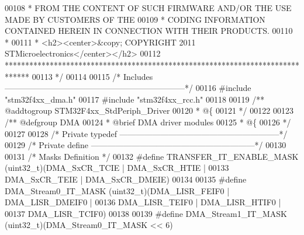 \begin{DoxyCode}
00108 \textcolor{comment}{  * FROM THE CONTENT OF SUCH FIRMWARE AND/OR THE USE MADE BY CUSTOMERS OF THE}
00109 \textcolor{comment}{  * CODING INFORMATION CONTAINED HEREIN IN CONNECTION WITH THEIR PRODUCTS.}
00110 \textcolor{comment}{  *}
00111 \textcolor{comment}{  * <h2><center>&copy; COPYRIGHT 2011 STMicroelectronics</center></h2>}
00112 \textcolor{comment}{  ******************************************************************************  }
00113 \textcolor{comment}{  */}
00114 
00115 \textcolor{comment}{/* Includes ------------------------------------------------------------------*/}
00116 \textcolor{preprocessor}{#}\textcolor{preprocessor}{include} "stm32f4xx_dma.h"
00117 \textcolor{preprocessor}{#}\textcolor{preprocessor}{include} "stm32f4xx_rcc.h"
00118 
00119 \textcolor{comment}{/** @addtogroup STM32F4xx\_StdPeriph\_Driver}
00120 \textcolor{comment}{  * @\{}
00121 \textcolor{comment}{  */}
00122 
00123 \textcolor{comment}{/** @defgroup DMA }
00124 \textcolor{comment}{  * @brief DMA driver modules}
00125 \textcolor{comment}{  * @\{}
00126 \textcolor{comment}{  */}
00127 
00128 \textcolor{comment}{/* Private typedef -----------------------------------------------------------*/}
00129 \textcolor{comment}{/* Private define ------------------------------------------------------------*/}
00130 
00131 \textcolor{comment}{/* Masks Definition */}
00132 \textcolor{preprocessor}{#}\textcolor{preprocessor}{define} \textcolor{preprocessor}{TRANSFER\_IT\_ENABLE\_MASK} \textcolor{preprocessor}{(}\textcolor{preprocessor}{uint32\_t}\textcolor{preprocessor}{)}\textcolor{preprocessor}{(}DMA_SxCR_TCIE \textcolor{preprocessor}{|} DMA_SxCR_HTIE \textcolor{preprocessor}{|}
00133                                            DMA_SxCR_TEIE \textcolor{preprocessor}{|} DMA_SxCR_DMEIE\textcolor{preprocessor}{)}
00134 
00135 \textcolor{preprocessor}{#}\textcolor{preprocessor}{define} \textcolor{preprocessor}{DMA\_Stream0\_IT\_MASK}     \textcolor{preprocessor}{(}\textcolor{preprocessor}{uint32\_t}\textcolor{preprocessor}{)}\textcolor{preprocessor}{(}DMA_LISR_FEIF0 \textcolor{preprocessor}{|} DMA_LISR_DMEIF0 \textcolor{preprocessor}{|}
00136                                            DMA_LISR_TEIF0 \textcolor{preprocessor}{|} DMA_LISR_HTIF0 \textcolor{preprocessor}{|}
00137                                            DMA_LISR_TCIF0\textcolor{preprocessor}{)}
00138 
00139 \textcolor{preprocessor}{#}\textcolor{preprocessor}{define} \textcolor{preprocessor}{DMA\_Stream1\_IT\_MASK}     \textcolor{preprocessor}{(}\textcolor{preprocessor}{uint32\_t}\textcolor{preprocessor}{)}\textcolor{preprocessor}{(}DMA_Stream0_IT_MASK \textcolor{preprocessor}{<<} 6\textcolor{preprocessor}{)}

\end{DoxyCode}
